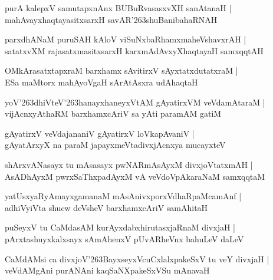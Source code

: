 \documentclass[twoside,12pt,openright]{book}
\def\S{\char'263}
\newcounter{shloka}[chapter]
\begin{document}
\begin{shloka}
purA kalepxV samutapxnAnx BUBuRvasasxvXH sanAtanaH |\\
mahAvayxhaqtayasitxsarxH savAR\S shuBanibahaRNAH 
\end{shloka}

\begin{shloka}
parxdhANaM puruSAH kAloV viSuNxbaRhamxmaheVshavxrAH |\\
satatxvXM rajasatxmasitxsarxH karxmAdAvxyXhaqtayaH samxqqtAH 
\end{shloka}

\begin{shloka}
OMkArasatxtapxraM barxhamx sAvitirxV sAyxtatxdutatxraM |\\
ESa maMtorx mahAyoVgaH sArAtAsxra udAhaqtaH 
\end{shloka}

\begin{shloka}
yoV\S dhiVteV\S hanayxhaneyxVtAM gAyatirxVM veVdamAtaraM |\\
vijAcnxyAthaRM barxhamxcAriV sa yAti paramAM gatiM 
\end{shloka}

\begin{shloka}
gAyatirxV veVdajananiV gAyatirxV loVkapAvaniV |\\
gAyatArxyX na paraM japayxmeVtadivxjAcnxya mucayxteV
\end{shloka}

\begin{shloka}
shArxvANasayx tu mAsasayx pwNARmAsAyxM divxjoVtatxmAH |\\
AsADhAyxM pwrxSaThxpadAyxM vA veVdoVpAkaraNaM samxqqtaM 
\end{shloka}

\begin{shloka}
yatUsxyaRyAmayxgamanaM mAsAnivxporxVdhaRpaMcamAnf |\\
adhiVyiVta shucw deVsheV barxhamxcAriV samAhitaH 
\end{shloka}

\begin{shloka}
puSeyxV tu CaMdasAM kurAyxdabxhirutasxjaRnaM divxjaH |\\
pArxtashuyxkalxsayx sAmAhenxV pUvARheVnx bahuLeV daLeV 
\end{shloka}

\begin{shloka}
CaMdAMsi ca divxjoV\S BayxseyxVcuCxlalxpakeSxV tu veY divxjaH |\\
veVdAMgAni purANAni kaqSaNXpakeSxVSu mAnavaH 
\end{shloka}
\end{document}
